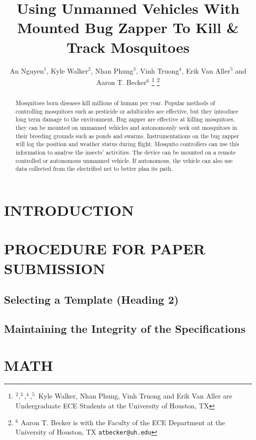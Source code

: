 \documentclass[letterpaper, 10 pt, conference]{ieeeconf}  %
\title{\LARGE \bf
Using Unmanned Vehicles With Mounted Bug Zapper To Kill \& Track Mosquitoes
}
\author{An Nguyen$^{1}$, Kyle Walker$^{2}$, Nhan Phung$^{3}$, Vinh Truong$^{4}$, Erik Van Aller$^{5}$ and Aaron T. Becker$^{6}$%
\thanks{$^{2},^{3},^{4},^{5}$ Kyle Walker, Nhan Phung, Vinh Truong and Erik Van Aller are Undergraduate ECE Students at the University of Houston, TX
}
\thanks{$^{6}$ Aaron T. Becker is with the Faculty of the ECE Department at the University of Houston, TX
        {\tt\small atbecker@uh.edu}}%
}
\begin{document}
\maketitle
\thispagestyle{empty}
\pagestyle{empty}


\begin{abstract}

Mosquitoes born diseases kill millions of human per year. Popular methods of controlling mosquitoes such as pesticide or adulticides are effective, but they introduce long term damage to the environment. Bug zapper are effective at killing mosquitoes, they can be mounted on unmanned vehicles and autonomously seek out mosquitoes in their breeding grounds such as ponds and swarms. Instrumentations on the bug zapper will log the position and weather status during flight. Mosquito controllers can use this information to analyse the insects' activities. The device can be mounted on a remote controlled or autonomous unmanned vehicle. If autonomous, the vehicle can also use data collected from the electrified net to better plan its path. 
\end{abstract}


\section{INTRODUCTION}



\section{PROCEDURE FOR PAPER SUBMISSION}

\subsection{Selecting a Template (Heading 2)}


\subsection{Maintaining the Integrity of the Specifications}



\section{MATH}
\end{document}
